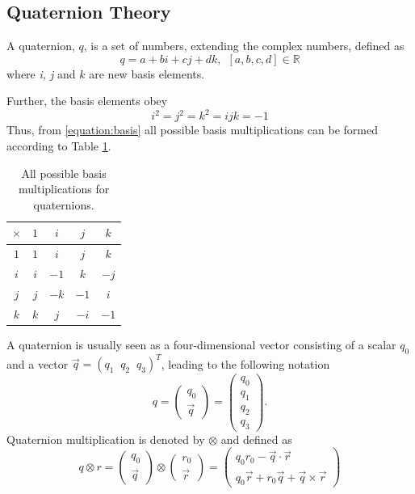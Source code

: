 \documentclass{LTHthesis}
\begin{document}
\subsection{Quaternion Theory}
%
A quaternion, $q$, is a set of numbers, extending the complex numbers, defined as
%
\begin{equation}
q = a+bi+cj+dk, \hspace{5pt}[a,b,c,d]\in \mathbb R
\end{equation} 
%
where \emph{i, j} and $k$ are new basis elements.

Further, the basis elements obey
%
\begin{equation}
\label{equation:basis}
i^2=j^2=k^2=ijk=-1
\end{equation}
%
Thus, from \ref{equation:basis} all possible basis multiplications can be formed according to Table \ref{table:basis}.
%
\begin{table}[!hbt]
\begin{center}
\begin{tabular}{|c|c|c|c|c|}
\hline
$\times$ & $1$ & $i$ & $j$ & $k$ \\
\hline
$1$ & $1$ & $i$ & $j$ & $k$ \\
\hline 
$i$ & $i$ & $-1$ & $k$ & $-j$\\
\hline
$j$ & $j$ & $-k$ & $-1$ & $i$ \\
\hline
$k$ & $k$ & $j$ & $-i$ & $-1$ \\
\hline
\end{tabular}
\end{center}
\caption{All possible basis multiplications for quaternions.}
\label{table:basis}
\end{table}
%
A quaternion is usually seen as a four-dimensional vector consisting of a scalar $q_0$ and a vector $\vec{q} = (q_1 \; \; q_2 \; \; q_3)^T$, leading to the following notation
%
\begin{equation}
q = \left(\begin{array}{c}q_0\\ \vec{q}\end{array}\right) = \left(\begin{array}{c}q_0\\ q_1 \\ q_2 \\ q_3\end{array}\right). 
\end{equation}  
%
Quaternion multiplication is denoted by $\otimes$ and defined as
%
\begin{equation}
q\otimes r = \left(\begin{array}{c}q_0\\ \vec{q}\end{array}\right) \otimes \left(\begin{array}{c}r_0\\ \vec{r}\end{array}\right) =
\left(\begin{array}{c}q_0r_0-\vec{q} \cdot \vec{r}\\ q_0\vec{r}+r_0\vec{q}+\vec{q}\times \vec{r}\end{array}\right)
\end{equation}
\end{document}
